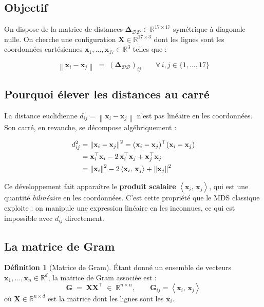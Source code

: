\documentclass[12pt, a4paper]{article}
\theoremstyle{plain}
\theoremstyle{definition}
\newtheorem{definition}[theorem]{Définition}
\newcommand{\R}{\mathbb{R}}
\newcommand{\norm}[1]{\left\lVert #1 \right\rVert}
\newcommand{\inner}[2]{\left\langle #1,\, #2 \right\rangle}
\newcommand{\mat}[1]{\mathbf{#1}}
\newcommand{\vect}[1]{\mathbf{#1}}
\newcommand{\Gram}{\mat{G}}
\begin{document}
\subsection{Objectif}

On dispose de la matrice de distances $\mat{\Delta}_{\mathcal{DD}} \in
\R^{17\times 17}$ symétrique à diagonale nulle. On cherche une configuration
$\mat{X} \in \R^{17 \times 3}$ dont les lignes sont les coordonnées
cartésiennes $\vect{x}_1, \ldots, \vect{x}_{17} \in \R^3$ telles que :

\begin{equation}
    \norm{\vect{x}_i - \vect{x}_j} \;=\; (\mat{\Delta}_{\mathcal{DD}})_{ij}
    \qquad \forall\, i, j \in \{1,\ldots,17\}
\end{equation}

\subsection{Pourquoi élever les distances au carré}

La distance euclidienne $d_{ij} = \norm{\vect{x}_i - \vect{x}_j}$ n'est pas
linéaire en les coordonnées. Son carré, en revanche, se décompose algébriquement :

\begin{align}
    d_{ij}^2 &= \norm{\vect{x}_i - \vect{x}_j}^2
    = (\vect{x}_i - \vect{x}_j)^\top (\vect{x}_i - \vect{x}_j) \notag \\
    &= \vect{x}_i^\top\vect{x}_i
       - 2\,\vect{x}_i^\top\vect{x}_j
       + \vect{x}_j^\top\vect{x}_j \notag \\
    &= \norm{\vect{x}_i}^2
       - 2\inner{\vect{x}_i}{\vect{x}_j}
       + \norm{\vect{x}_j}^2
    \label{eq:dist_squared}
\end{align}

Ce développement fait apparaître le \textbf{produit scalaire}
$\inner{\vect{x}_i}{\vect{x}_j}$, qui est une quantité \emph{bilinéaire} en
les coordonnées. C'est cette propriété que le MDS classique exploite : on
manipule une expression linéaire en les inconnues, ce qui est impossible avec
$d_{ij}$ directement.

\subsection{La matrice de Gram}

\begin{definition}[Matrice de Gram]
    Étant donné un ensemble de vecteurs $\vect{x}_1, \ldots, \vect{x}_n \in
    \R^d$, la matrice de Gram associée est :
    \begin{equation}
        \Gram \;=\; \mat{X}\mat{X}^\top \;\in\; \R^{n \times n},
        \qquad \Gram_{ij} = \inner{\vect{x}_i}{\vect{x}_j}
    \end{equation}
    où $\mat{X} \in \R^{n \times d}$ est la matrice dont les lignes sont les
    $\vect{x}_i$.
\end{definition}
\end{document}
